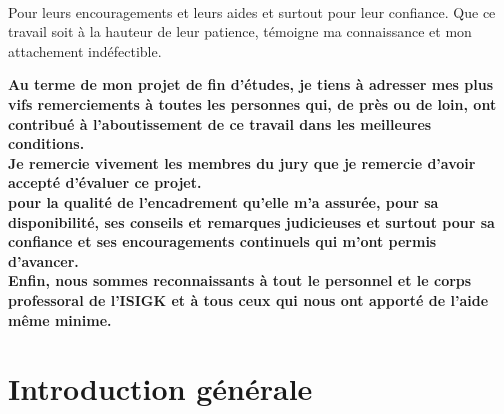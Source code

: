 \documentclass[12 pt]{report}
\begin{document}
\begin{center}
\Large\textbf{\selectfont {A}}\\
\Large\textbf{\selectfont {Mes frères, mes amis et mes enseignants}}
\end{center}
 Pour leurs encouragements et leurs aides et surtout pour leur confiance.
Que ce travail soit à la hauteur de leur patience, témoigne ma connaissance et mon attachement indéfectible.
 
\newpage
\thispagestyle{empty}
\begin{center}
\Huge\textbf{\selectfont {Remerciement}}
\end{center}

\textbf{Au terme de mon projet de fin d’études, je tiens à adresser mes plus vifs remerciements à toutes les personnes qui, de près ou de loin, ont contribué à l’aboutissement de ce travail dans les meilleures conditions.}
 \\
 
 \textbf{Je remercie vivement les membres du jury que je remercie d’avoir accepté d’évaluer ce projet.}
 \\

\textbf{pour la qualité de l’encadrement qu’elle m’a assurée, pour sa disponibilité, ses conseils et remarques judicieuses et surtout pour sa confiance et ses encouragements continuels qui m’ont permis d’avancer.} 
\\

\textbf{Enfin, nous sommes reconnaissants à tout le personnel et le corps professoral de l’ISIGK et à tous ceux qui nous ont apporté de l’aide même minime.}
  

{
    \fancyhead{}
    \fancyfoot{}
}
 \renewcommand\thepage{}
\tableofcontents
\renewcommand\thepage{\arabic{page}}  
{
    \fancyhead{}
    \fancyfoot[C]{\thepage}
}
\renewcommand\thepage{}
\newpage
\renewcommand\thepage{\arabic{page}}  
{
    \fancyhead{}
    \fancyfoot[C]{\thepage}
}
\renewcommand\thepage{}
\listoffigures
\renewcommand\thepage{\arabic{page}}  
{
    \fancyhead{}
    \fancyfoot[C]{\thepage}
}
\renewcommand\thepage{}
\newpage
\renewcommand\thepage{\arabic{page}}  
{
    \fancyhead{}
    \fancyfoot[C]{\thepage}
}
\newpage

\newpage
\renewcommand\thepage{}
\listoftables
\thispagestyle{empty}
\newpage
\renewcommand{\thepage}{\arabic{page}}
\setcounter{page}{1}
\chapter*{Introduction générale}  
\end{document}
